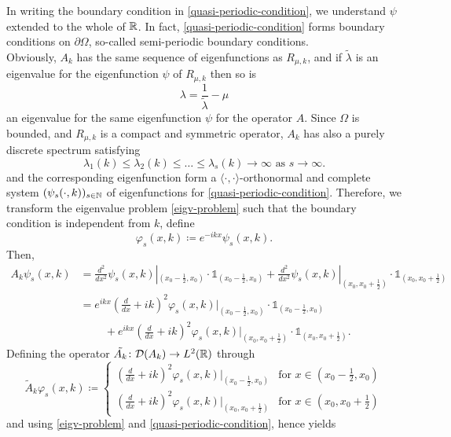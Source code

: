In writing the boundary condition in \eqref{quasi-periodic-condition}, we understand $\psi$ extended to the whole of $\mathbb{R}$. In fact, \eqref{quasi-periodic-condition} forms boundary conditions on $\partial \Omega$, so-called semi-periodic boundary conditions. 
~\\
Obviously, $A_{k}$ has the same sequence of eigenfunctions as $R_{\mu, k}$, and if $\tilde{\lambda}$ is an eigenvalue for the eigenfunction $\psi$ of $R_{\mu, k}$ then so is
	\[ \lambda = \frac{1}{\tilde{\lambda}} - \mu \]
 an eigenvalue for the same eigenfunction $\psi$ for the operator $A$. Since $\Omega$ is bounded, and $R_{\mu, k}$ is a compact and symmetric operator, $A_{k}$ has also a purely discrete spectrum satisfying	
	\[ \lambda_{1}(k) \leq \lambda_{2}(k) \leq \dotsc \leq \lambda_{s}(k) \rightarrow \infty \text{ as } s \rightarrow \infty. \]
and the corresponding eigenfunction form a $\langle \cdot , \cdot \rangle$-orthonormal and complete system $(\psi_{s}(\cdot, k))_{s \in \mathbb{N}}$ of eigenfunctions for \eqref{quasi-periodic-condition}. Therefore, we transform the eigenvalue problem \eqref{eigv-problem} such that the boundary condition is independent from $k$, define
	\[ \varphi_{s}(x, k) \coloneqq e^{-ikx} \psi_{s}(x, k). \]
Then,
	\begin{align*}
		A_{k} \psi_{s}(x, k) & = \frac{d^{2}}{dx^{2}} \psi_{s}(x, k)|_{(x_{0} - \frac{1}{2}, x_{0})} \cdot \mathds{1}_{(x_{0} - \frac{1}{2}, x_{0})} + \frac{d^{2}}{dx^{2}} \psi_{s}(x, k)|_{(x_{0}, x_{0}  + \frac{1}{2})} \cdot \mathds{1}_{(x_{0}, x_{0} + \frac{1}{2})} \\
				& = e^{ikx} \left( \frac{d}{dx} + ik \right)^{2} \varphi_{s}(x, k)|_{(x_{0} - \frac{1}{2}, x_{0})} \cdot \mathds{1}_{(x_{0} - \frac{1}{2}, x_{0})} \\
				& ~\qquad + e^{ikx} \left( \frac{d}{dx} + ik \right)^{2} \varphi_{s}(x, k)|_{(x_{0}, x_{0}  + \frac{1}{2})} \cdot \mathds{1}_{(x_{0}, x_{0} + \frac{1}{2})}.
	\end{align*}
Defining the operator $\tilde{A_{k}} \colon \mathcal{D}(A_{k}) \rightarrow L^{2}(\mathbb{R})$ through 
	\[ \tilde{A}_{k} \varphi_{s}(x, k) \coloneqq \begin{cases}
 		\left( \frac{d}{dx} + ik \right)^{2} \varphi_{s}(x, k)|_{(x_{0} - \frac{1}{2}, x_{0})} & \text{for } x \in (x_{0} - \frac{1}{2}, x_{0}) \\ \left( \frac{d}{dx} + ik \right)^{2} \varphi_{s}(x, k)|_{(x_{0}, x_{0}  + \frac{1}{2})} & \text{for } x \in (x_{0}, x_{0} + \frac{1}{2})
 	\end{cases} \] 
and using \eqref{eigv-problem} and \eqref{quasi-periodic-condition}, hence yields
